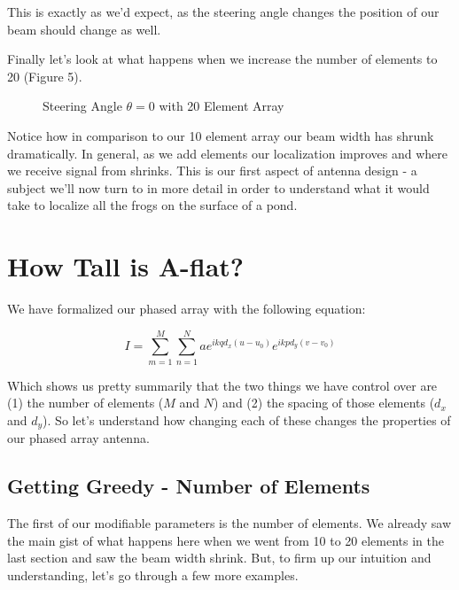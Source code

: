 \documentclass[10pt,a5paper]{book}
\begin{document}
This is exactly as we'd expect, as the steering angle changes the position of our beam should change as well. 

Finally let's look at what happens when we increase the number of elements to 20 (Figure 5).

\begin{figure}[!htb]
\caption{\label{fig:my-label} Steering Angle $\theta=0$ with 20 Element Array}
\end{figure}

Notice how in comparison to our 10 element array our beam width has shrunk dramatically. In general, as we add elements our localization improves and where we receive signal from shrinks. This is our first aspect of antenna design - a subject we'll now turn to in more detail in order to understand what it would take to localize all the frogs on the surface of a pond. 

\clearpage


\chapter{How Tall is A-flat?}
We have formalized our phased array with the following equation:

\begin{equation}
I=\sum_{m=1}^M \sum_{n=1}^N  ae^{ikqd_x(u-u_0)}e^{ikpd_y(v-v_0)}
\end{equation}

Which shows us pretty summarily that the two things we have control over are (1) the number of elements ($M$ and $N$) and (2) the spacing of those elements ($d_x$ and $d_y$). So let's understand how changing each of these changes the properties of our phased array antenna. 

\section{Getting Greedy - Number of Elements}
The first of our modifiable parameters is the number of elements. We already saw the main gist of what happens here when we went from 10 to 20 elements in the last section and saw the beam width shrink. But, to firm up our intuition and understanding, let's go through a few more examples. 
\end{document}
